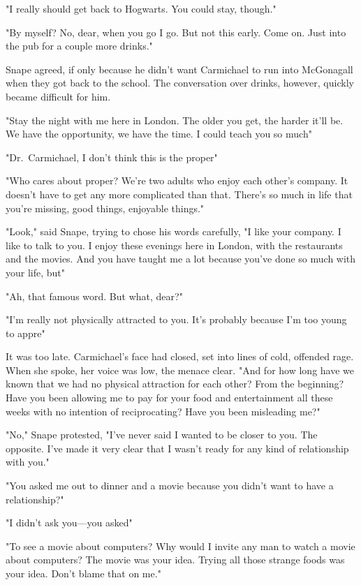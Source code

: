 "I really should get back to Hogwarts. You could stay, though."

"By myself? No, dear, when you go I go. But not this early. Come on. Just into the pub for a couple more drinks."

Snape agreed, if only because he didn't want Carmichael to run into McGonagall when they got back to the school. The conversation over drinks, however, quickly became difficult for him.

"Stay the night with me here in London. The older you get, the harder it'll be. We have the opportunity, we have the time. I could teach you so much{\el}"

"Dr.~Carmichael, I don't think this is the proper{\el}"

"Who cares about proper? We're two adults who enjoy each other's company. It doesn't have to get any more complicated than that. There's so much in life that you're missing, good things, enjoyable things."

"Look," said Snape, trying to chose his words carefully, "I like your company. I like to talk to you. I enjoy these evenings here in London, with the restaurants and the movies. And you have taught me a lot because you've done so much with your life, but{\el}"

"Ah, that famous word. But what, dear?"

"I'm really not physically attracted to you. It's probably because I'm too young to appre{\el}"

It was too late. Carmichael's face had closed, set into lines of cold, offended rage. When she spoke, her voice was low, the menace clear. "And for how long have we known that we had no physical attraction for each other? From the beginning? Have you been allowing me to pay for your food and entertainment all these weeks with no intention of reciprocating? Have you been misleading me?"

"No," Snape protested, "I've never said I wanted to be closer to you. The opposite. I've made it very clear that I wasn't ready for any kind of relationship with you."

"You asked me out to dinner and a movie because you didn't want to have a relationship?"

"I didn't ask you—you asked{\el}"

"To see a movie about computers? Why would I invite any man to watch a movie about computers? The movie was your idea. Trying all those strange foods was your idea. Don't blame that on me."


